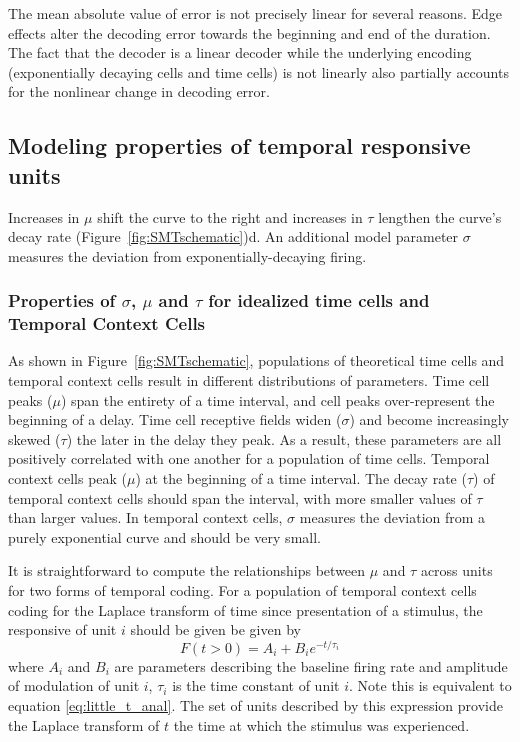 \documentclass{apa}
\begin{document}
The mean absolute value of error is not precisely linear for several reasons.  Edge effects alter the decoding error towards the beginning and end of the duration.  The fact that the decoder is a linear decoder while the underlying encoding (exponentially decaying cells and time cells) is not linearly also partially accounts for the nonlinear change in decoding error.


\subsection{Modeling properties of temporal responsive units}
Increases in
$\mu$ shift the curve to the right and increases in $\tau$ lengthen the
curve's decay rate (Figure~\ref{fig:SMTschematic})d. 
An additional model parameter $\sigma$ measures the deviation from exponentially-decaying
firing. 


\subsubsection{Properties of $\sigma$, $\mu$ and $\tau$ for idealized time cells
and Temporal Context Cells}

As shown in Figure~\ref{fig:SMTschematic}, populations of theoretical time cells
and temporal context cells result in different distributions of parameters. Time
cell peaks ($\mu$) span the entirety of a time interval, and cell peaks over-represent
the beginning of a delay. Time cell receptive fields widen 
($\sigma$) and become increasingly skewed ($\tau$) the later in the delay they
peak. As a result, these parameters are all positively correlated with one another
for a population of time cells. Temporal context cells peak ($\mu$) at the
beginning of a time interval. The decay rate ($\tau$) of temporal
context cells should span the interval, with more smaller values of
$\tau$ than larger values. In temporal context cells, $\sigma$ measures
the deviation from a purely exponential curve and should be very small.  

It is straightforward to compute the relationships between $\mu$ and $\tau$
across units for two forms of temporal coding.  For a population of temporal
context cells coding for the Laplace transform of time since presentation of a
stimulus, the responsive of unit $i$ should be given be given by 
\begin{equation}
		F(t > 0) = A_i + B_i e^{- t/\tau_i}
		\label{eq:Laplaceunits}
\end{equation}
where $A_i$ and $B_i$ are parameters describing the baseline firing rate and
amplitude of modulation of unit $i$, $\tau_i$ is the time constant of unit
$i$.  Note this is equivalent to equation \eqref{eq:little_t_anal}.
The set of units described by this expression provide the Laplace transform of
$t$ the time at which the stimulus was experienced.
\end{document}

